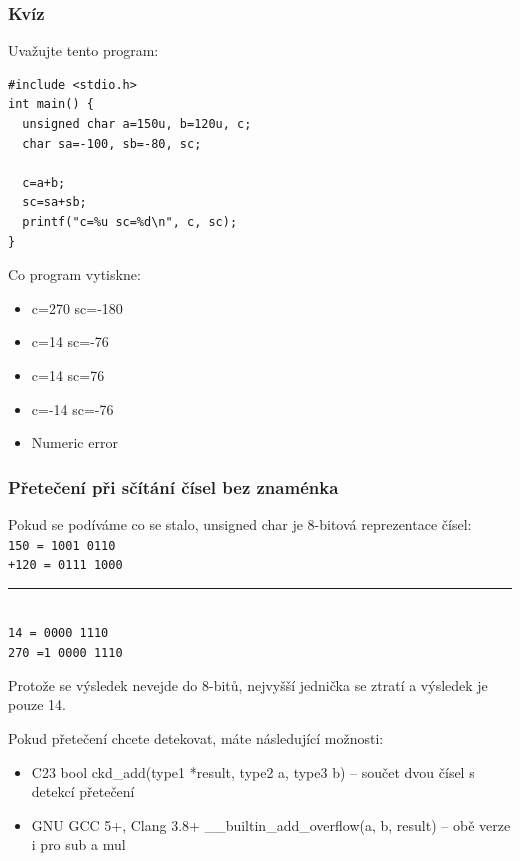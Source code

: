 \begin{frame}[fragile, shrink=5]
\frametitle{Kvíz}

Uvažujte tento program:
\begin{verbatim}
#include <stdio.h>
int main() {
  unsigned char a=150u, b=120u, c;
  char sa=-100, sb=-80, sc;
  
  c=a+b;
  sc=sa+sb;
  printf("c=%u sc=%d\n", c, sc);
}
\end{verbatim}

Co program vytiskne:
\begin{itemize}
\item[A] c=270 sc=-180
\item[B] c=14 sc=-76
\item[C] c=14 sc=76
\item[D] c=-14 sc=-76
\item[E] Numeric error
\end{itemize}
\end{frame}

\begin{frame}
\frametitle{Přetečení při sčítání čísel bez znaménka}


Pokud se podíváme co se stalo, unsigned char je 8-bitová reprezentace čísel:\\
\texttt{\phantom{x}150 = \phantom{x}1001 0110}\\
\texttt{+120 = \phantom{x}0111 1000}\vspace{-6pt}\\
\rule[0pt]{3.6cm}{0.4pt}\\
\texttt{\phantom{xx}14 = \phantom{x}0000 1110}\\
\texttt{\phantom{x}270 =1 0000 1110}

Protože se výsledek nevejde do 8-bitů, nejvyšší jednička se ztratí a výsledek je pouze 14.

Pokud přetečení chcete detekovat, máte následující možnosti:
\begin{itemize}
\item C23 bool ckd\_add(type1 *result, type2 a, type3 b) -- součet dvou čísel s detekcí přetečení
\item GNU GCC 5+, Clang 3.8+ \_\_builtin\_add\_overflow(a, b, result) -- obě verze i pro sub a mul
\end{itemize}
\end{frame}

